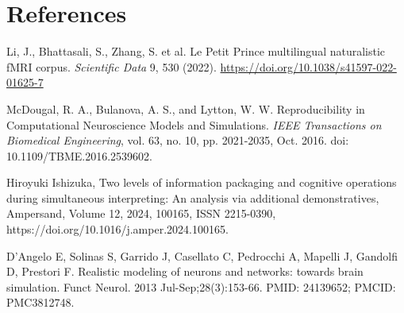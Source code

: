 \section{References}
\begin{thebibliography}{99}

Li, J., Bhattasali, S., Zhang, S. et al. Le Petit Prince multilingual naturalistic fMRI corpus. \textit{Scientific Data} 9, 530 (2022). \url{https://doi.org/10.1038/s41597-022-01625-7}

McDougal, R. A., Bulanova, A. S., and Lytton, W. W. Reproducibility in Computational Neuroscience Models and Simulations. \textit{IEEE Transactions on Biomedical Engineering}, vol. 63, no. 10, pp. 2021-2035, Oct. 2016. doi: 10.1109/TBME.2016.2539602.

Hiroyuki Ishizuka,
Two levels of information packaging and cognitive operations during simultaneous interpreting: An analysis via additional demonstratives,
Ampersand,
Volume 12,
2024,
100165,
ISSN 2215-0390,
https://doi.org/10.1016/j.amper.2024.100165.

D'Angelo E, Solinas S, Garrido J, Casellato C, Pedrocchi A, Mapelli J, Gandolfi D, Prestori F. Realistic modeling of neurons and networks: towards brain simulation. Funct Neurol. 2013 Jul-Sep;28(3):153-66. PMID: 24139652; PMCID: PMC3812748.



\end{thebibliography}

